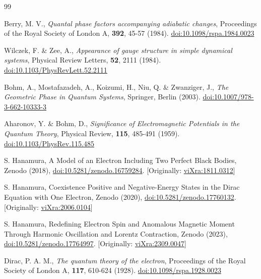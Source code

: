 \documentclass[%
 reprint,
 amsmath,amssymb,
 aps,
]{revtex4-1}
\numberwithin{equation}{section}%
\begin{document}
\begin{thebibliography}{99}

Berry, M. V.,
\textit{Quantal phase factors accompanying adiabatic changes},
Proceedings of the Royal Society of London A,
\textbf{392}, 45-57 (1984).
\href{https://doi.org/10.1098/rspa.1984.0023}{doi:10.1098/rspa.1984.0023}

Wilczek, F. \& Zee, A.,
\textit{Appearance of gauge structure in simple dynamical systems},
Physical Review Letters,
\textbf{52}, 2111 (1984).
\href{https://doi.org/10.1103/PhysRevLett.52.2111}{doi:10.1103/PhysRevLett.52.2111}

Bohm, A., Mostafazadeh, A., Koizumi, H., Niu, Q. \& Zwanziger, J.,
\textit{The Geometric Phase in Quantum Systems},
Springer, Berlin (2003).
\href{https://doi.org/10.1007/978-3-662-10333-3}{doi:10.1007/978-3-662-10333-3}

Aharonov, Y. \& Bohm, D.,
\textit{Significance of Electromagnetic Potentials in the Quantum Theory},
Physical Review,
\textbf{115}, 485-491 (1959).
\href{https://doi.org/10.1103/PhysRev.115.485}{doi:10.1103/PhysRev.115.485}

S. Hanamura, A Model of an Electron Including Two Perfect Black Bodies, Zenodo (2018), \href{https://doi.org/10.5281/zenodo.16759284}{doi:10.5281/zenodo.16759284}. [Originally: \href{http://vixra.org/abs/1811.0312}{viXra:1811.0312}]

S. Hanamura, Coexistence Positive and Negative-Energy States in the Dirac Equation with One Electron, Zenodo (2020), \href{https://doi.org/10.5281/zenodo.17760132}{doi:10.5281/zenodo.17760132}. [Originally: \href{https://vixra.org/abs/2006.0104}{viXra:2006.0104}]

S. Hanamura, Redefining Electron Spin and Anomalous Magnetic Moment Through Harmonic Oscillation and Lorentz Contraction, Zenodo (2023), \href{https://doi.org/10.5281/zenodo.17764997}{doi:10.5281/zenodo.17764997}. [Originally: \href{https://vixra.org/abs/2309.0047}{viXra:2309.0047}]

Dirac, P. A. M.,
\textit{The quantum theory of the electron},
Proceedings of the Royal Society of London A,
\textbf{117}, 610-624 (1928).
\href{https://doi.org/10.1098/rspa.1928.0023}{doi:10.1098/rspa.1928.0023}


\end{thebibliography}
\end{document}
